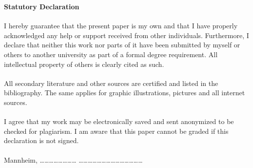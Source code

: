 \newpage \noindent
{\large \textbf{Statutory Declaration}}\\
\\I hereby guarantee that the present paper is my own and that I have properly acknowledged any help or support received from other individuals. Furthermore, I declare that neither this work nor parts of it have been submitted by myself or others to another university as part of a formal degree requirement. All intellectual property of others is clearly cited as such.\\
\\All secondary literature and other sources are certified and listed in the bibliography. The same applies for graphic illustrations, pictures and all internet sources.\\
\\I agree that my work may be electronically saved and sent anonymized to be checked for plagiarism. I am aware that this paper cannot be graded if this declaration is not signed.\\
\\Mannheim, …………………… ……………………………………